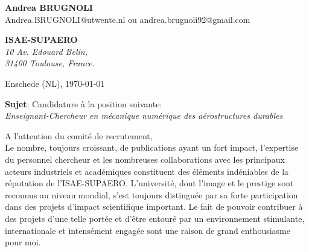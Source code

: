 \documentclass[11pt]{letter}
\begin{document}
	\sffamily
	\begin{flushleft}
		{\bfseries Andrea \textsc{BRUGNOLI}}\\[.35ex]
		Andrea.BRUGNOLI@utwente.nl ou andrea.brugnoli92@gmail.com
	\end{flushleft}
	\begin{flushright}
		{\bfseries ISAE-SUPAERO}\\[.35ex]
		\small\itshape
		10 Av. Edouard Belin,  \\
		31400 Toulouse, France.
	\end{flushright}
	\begin{flushright}
		Enschede (NL), \today 
	\end{flushright}
	\textbf{Sujet}: Candidature \`a la position suivante:\\
	\textit{Enseignant-Chercheur en mécanique numérique des aérostructures durables}
	
	
	A l'attention du comité de recrutement, \\
	Le nombre, toujours croissant, de publications ayant un fort impact, l'expertise du personnel chercheur et les nombreuses collaborations avec les principaux acteurs industriels et académiques constituent des éléments indéniables de la réputation de l'ISAE-SUPAERO. L'université, dont l'image et le prestige sont reconnus au niveau mondial, s'est toujours distinguée par sa forte participation dans des projets d'impact scientifique important. Le fait de pouvoir contribuer à des projets d'une telle portée et d'être entouré par un environnement stimulante, internationale et intensément engagée sont une raison de grand enthousiasme pour moi. 
	
\end{document}
